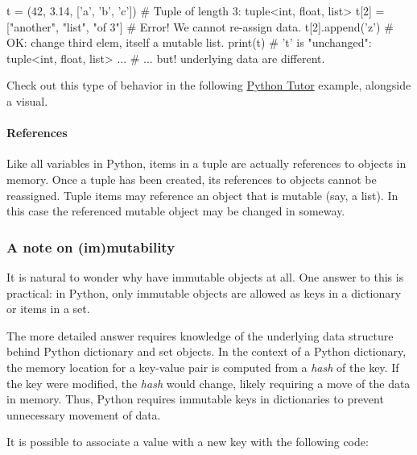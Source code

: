 \documentclass[12pt,letterpaper,twoside]{article}
\begin{document}
\begin{python}
t = (42, 3.14, ['a', 'b', 'c'])      # Tuple of length 3: tuple<int, float, list>
t[2] = ["another", "list", "of 3"]   # Error! We cannot re-assign data.
t[2].append('z')                     # OK: change third elem, itself a mutable list.
print(t)                             # 't' is "unchanged": tuple<int, float, list> ...
                                     # ... but! underlying data are different.
\end{python}

Check out this type of behavior in the following
\href{http://www.pythontutor.com/visualize.html\#code=my_tup\%20\%3D\%20(2,\%20'a\%20string',\%20\%5B1,3,8\%5D\%29\%0Amy_tup\%5B2\%5D\%5B0\%5D\%20\%3D\%20'new\%20data'\%0Aprint(my_tup\%29\%0A\&cumulative=false\&curInstr=0\&heapPrimitives=false\&mode=display\&origin=opt-frontend.js\&py=3\&rawInputLstJSON=\%5B\%5D\&textReferences=false}{Python
Tutor} example, alongside a visual.

\vspace{-5pt}
\paragraph{References}
Like all variables in Python, items in a tuple are actually references
to objects in memory. Once a tuple has been created, its references to
objects cannot be reassigned. Tuple items may reference an object that
is mutable (say, a list). In this case the referenced mutable object may
be changed in someway.

\vspace{-5pt}
\subsubsection{A note on (im)mutability}
It is natural to wonder why have immutable objects at all. One answer to
this is practical: in Python, only immutable objects are allowed as keys
in a dictionary or items in a set.

The more detailed answer requires knowledge of the underlying data
structure behind Python dictionary and set objects. In the context of a
Python dictionary, the memory location for a key-value pair is computed
from a \emph{hash} of the key. If the key were modified, the \emph{hash}
would change, likely requiring a move of the data in memory. Thus,
Python requires immutable keys in dictionaries to prevent unnecessary
movement of data.

It is possible to associate a value with a new key with the following
code:
\end{document}

